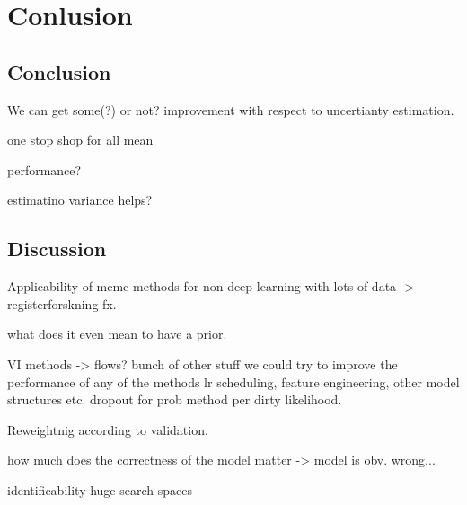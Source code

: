 \documentclass[a4paper,twoside,11pt]{report} %
\begin{document}

\pagecolor{white}
\pagestyle{empty}
\cleardoublepage 

\clearpage 
\pagestyle{main}

\clearpage 

\clearpage 

\cleardoublepage 


\tableofcontents
\cleardoublepage 






\chapter{Conlusion}

\section{Conclusion}
We can get some(?) or not? improvement with respect to uncertianty estimation.

one stop shop for all mean

performance?

estimatino variance helps?

\section{Discussion}
Applicability of mcmc methods for non-deep learning with lots of data -> registerforskning fx.

what does it even mean to have a prior.

VI methods -> flows?
bunch of other stuff we could try to improve the performance of any of the methods lr scheduling, feature engineering, other model structures etc. 
dropout for prob method per dirty likelihood.

Reweightnig according to validation.

how much does the correctness of the model matter -> model is obv. wrong...



identificability huge search spaces




\nocite{*}
\printbibliography[heading=bibintoc,title={Bibliography}]
\cleardoublepage 
\appendix

\cleartoleftpage

\end{document}

